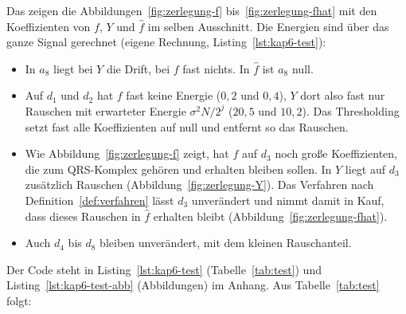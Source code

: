 \documentclass[a4paper,11pt,bibliography=totoc,listof=totoc,headinclude=true,cleardoublepage=empty,oneside]{scrbook}
\theoremstyle{plain}
\theoremstyle{definition}
\begin{document}
Das zeigen die Abbildungen~\ref{fig:zerlegung-f} bis~\ref{fig:zerlegung-fhat}
mit den Koeffizienten von $f$, $Y$ und $\hat f$ im selben Ausschnitt. Die
Energien sind über das ganze Signal gerechnet (eigene Rechnung,
Listing~\ref{lst:kap6-test}):
\begin{itemize}
\item In $a_8$ liegt bei $Y$ die Drift, bei $f$ fast nichts. In $\hat f$ ist
  $a_8$ null.
\item Auf $d_1$ und $d_2$ hat $f$ fast keine Energie ($0{,}2$ und $0{,}4$),
  $Y$ dort also fast nur Rauschen mit erwarteter Energie $\sigma^2 N/2^j$
  ($20{,}5$ und $10{,}2$). Das Thresholding setzt fast alle Koeffizienten auf
  null und entfernt so das Rauschen.
\item Wie Abbildung~\ref{fig:zerlegung-f} zeigt, hat $f$ auf $d_3$ noch
  gro\ss e Koeffizienten, die zum QRS-Komplex gehören und erhalten bleiben
  sollen. In $Y$ liegt auf $d_3$ zusätzlich Rauschen
  (Abbildung~\ref{fig:zerlegung-Y}). Das Verfahren nach
  Definition~\ref{def:verfahren} lässt $d_3$ unverändert und nimmt damit in
  Kauf, dass dieses Rauschen in $\hat f$ erhalten bleibt
  (Abbildung~\ref{fig:zerlegung-fhat}).
\item Auch $d_4$ bis $d_8$ bleiben unverändert, mit dem kleinen Rauschanteil.
\end{itemize}
Der Code steht in Listing~\ref{lst:kap6-test} (Tabelle~\ref{tab:test}) und
Listing~\ref{lst:kap6-test-abb} (Abbildungen) im Anhang.
Aus Tabelle~\ref{tab:test} folgt:
\end{document}
